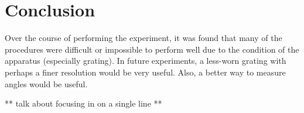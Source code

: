 \documentclass[paper=a4, fontsize=11pt]{scrartcl} %
\numberwithin{equation}{section}
\numberwithin{figure}{section}
\numberwithin{table}{section}
\begin{document}


\section{Conclusion}


Over the course of performing the experiment, it was found that many of the procedures were difficult or impossible to perform well due to the condition of the apparatus (especially grating). In future experiments, a less-worn grating with perhaps a finer resolution would be very useful. Also, a better way to measure angles would be useful.

** talk about focusing in on a single line **




\end{document}

